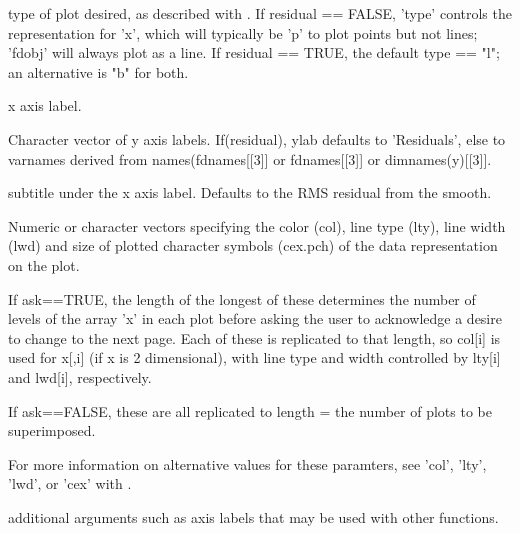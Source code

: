 \documentclass{article}
\begin{document}
\begin{Arguments}
\begin{ldescription}
\item[\code{type}] type of plot desired, as described with .  If
residual == FALSE, 'type' controls the representation for 'x', which
will typically be 'p' to plot points but not lines;  'fdobj' will
always plot as a line.  If residual == TRUE, the default type ==
"l";  an alternative is "b" for both.  

\item[\code{xlab}] x axis label. 
\item[\code{ylab}] Character vector of y axis labels.  If(residual), ylab defaults to
'Residuals', else to varnames derived from names(fdnames[[3]] or
fdnames[[3]] or dimnames(y)[[3]]. 

\item[\code{sub}] subtitle under the x axis label.  Defaults to the RMS residual from
the smooth.  

\item[\code{col, lty, lwd, cex.pch}] Numeric or character vectors specifying the color (col), line type
(lty), line width (lwd) and size of plotted character symbols
(cex.pch) of the data representation on the plot. 

If ask==TRUE, the length of the longest of these determines the
number of levels of the array 'x' in each plot before asking the
user to acknowledge a desire to change to the next page.  Each of
these is replicated to that length, so col[i] is used for x[,i] (if
x is 2 dimensional), with line type and width controlled by lty[i]
and lwd[i], respectively.  

If ask==FALSE, these are all replicated to length = the number of
plots to be superimposed.

For more information on alternative values for these paramters, see
'col', 'lty', 'lwd', or 'cex' with .    

\item[\code{... }] additional arguments such as axis labels that may be used with other
 functions. 

\end{ldescription}
\end{Arguments}
\end{document}
